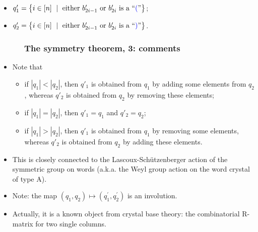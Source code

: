 \documentclass{beamer}
\newcommand{\blue}{\color{blue}}
\newcommand{\fti}[1]{\frametitle{\ \ \ \ \ #1}}
\newcommand{\abs}[1]{\left| #1 \right|}
\theoremstyle{plain}
\newcommand{\0}{\phantom{c}}
\begin{document}
\begin{frame}
\begin{itemize}
\begin{itemize}
\begin{itemize}
\item $q_{1}^{\prime}=\left\{  i\in\left[  n\right]  \ \mid\ \text{either }
b'_{2i-1} \text{ or } b'_{2i} \text{ is a
\textquotedblleft}{\blue (}\text{\textquotedblright}\right\}  $;

\item $q_{2}^{\prime}=\left\{  i\in\left[  n\right]  \ \mid\ \text{either }
b'_{2i-1} \text{ or } b'_{2i} \text{ is a
\textquotedblleft}{\blue )}\text{\textquotedblright}\right\}  $.
\end{itemize}

\end{itemize}

\end{itemize}
\vspace{10cm}
\end{frame}

\begin{frame}
\fti{The symmetry theorem, 3: comments}

\begin{itemize}

\item Note that
      \begin{itemize}
      \item if $\abs{q_1} < \abs{q_2}$, then $q'_1$ is obtained from $q_1$
            by adding some elements from $q_2$, whereas $q'_2$ is obtained
            from $q_2$ by removing these elements;
      \item if $\abs{q_1} = \abs{q_2}$, then $q'_1 = q_1$ and $q'_2 = q_2$;
      \item if $\abs{q_1} > \abs{q_2}$, then $q'_1$ is obtained from $q_1$
            by removing some elements, whereas $q'_2$ is obtained
            from $q_2$ by adding these elements.
      \end{itemize}
      \vspace{0.25pc}

\pause
\item This is closely connected to the Lascoux-Sch\"{u}tzenberger action of the
symmetric group on words
(a.k.a. the Weyl group action on the word crystal of type A).
\vspace{0.25pc}

\item Note: the map $\left(  q_{1},q_{2}\right)  \mapsto\left(  q_{1}^{\prime
},q_{2}^{\prime}\right)  $ is an involution. \pause
\vspace{0.25pc}

\item Actually, it is a known object from crystal base theory: the
      combinatorial R-matrix for two single columns.
\end{itemize}
\vspace{10cm}
\end{frame}
\end{document}
